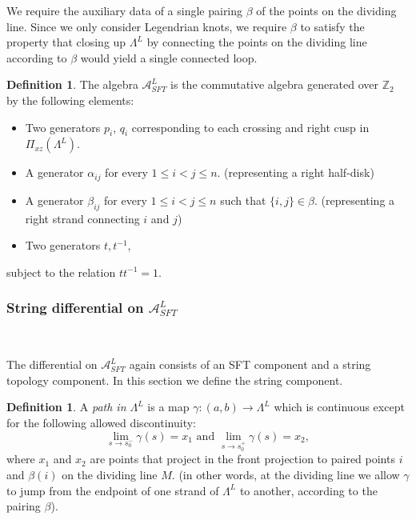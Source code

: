 \documentclass[a4paper,final, reqno]{amsart}
\theoremstyle{plain}
\theoremstyle{definition}
\newtheorem{Def}[Th]{Definition}
\newcommand{\A}{\mathcal{A}}
\begin{document}
	
	We require the auxiliary data of a single pairing $\beta$ of the points on the dividing line. Since we only consider Legendrian knots, we require $\beta$ to satisfy the property that closing up $\Lambda^L$ by connecting the points on the dividing line according to $\beta$ would yield a single connected loop. 
	
	\begin{Def}
		
		
		The algebra $\A^L_{SFT}$ is the commutative algebra generated over $\mathbb{Z}_2$ by the following elements: 
		
		\begin{itemize}
			\item Two generators $p_i$, $q_i$ corresponding to each crossing and right cusp in $\Pi_{xz}(\Lambda^L)$.
			\item A generator $\alpha_{ij}$ for every $1\leq i < j \leq n$. (representing a right half-disk)
			\item A generator $\beta_{ij}$ for every $1\leq i<j\leq n$ such that  $\{i,j\} \in \beta$. (representing a right strand connecting $i$ and $j$)
			\item Two generators $t, t^{-1}$,
		\end{itemize}
		subject to the relation $tt^{-1} = 1$.
		
	\end{Def}
	
	
	
	\subsubsection{String differential on $\A^L_{SFT}$}\-\
	
	The differential on $\A^L_{SFT}$ again consists of an SFT component and a string topology component. In this section we define the string component. 
	
	
	
	\begin{Def}\label{def:path}
		A \emph{path in $\Lambda^L$} is a map $\gamma: (a,b) \to \Lambda^L$ which is continuous except for the following allowed discontinuity:
		\[ \lim_{s\to s_0^-} \gamma(s) = x_1 \text{ and } \lim_{s\to s_0^+} \gamma(s) = x_2,\] 
		where $x_1$ and $x_2$ are points that project in the front projection to paired points $i$ and $\beta(i)$ on the dividing line $M$. 
		(in other words, at the dividing line we allow $\gamma$ to jump from the endpoint of one strand of $\Lambda^L$ to another, according to the pairing $\beta$).
	\end{Def}
	
\end{document}
